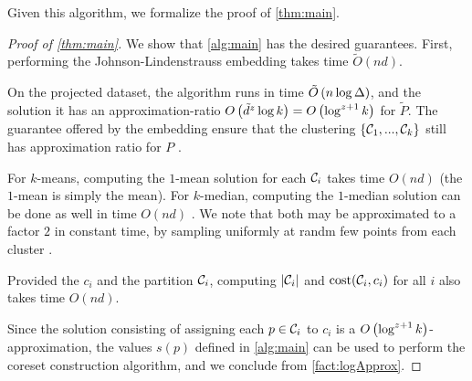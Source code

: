 Given this algorithm, we formalize the proof of \cref{thm:main}.

\begin{proof}[Proof of \cref{thm:main}]
We show that \cref{alg:main} has the desired guarantees.
First, performing the Johnson-Lindenstrauss embedding takes time $\tilde O(nd)$.

On the projected dataset, the algorithm \fkmeans runs in time $\tilde O\left( n \log \Delta\right)$, and the solution it has an approximation-ratio $O\left( \tilde{d}^z \log k\right) = O\left(\log^{z+1} k\right)$ for $\tilde P$. 
The guarantee offered by the embedding ensure that the clustering $\left\{ \mathcal C_1,...,\mathcal C_k\right\}$ still has approximation ratio for $P$ \cite{makarychev2019performance}. 

For $k$-means, computing the $1$-mean solution for each $\mathcal C_i$ takes time $O(nd)$ (the $1$-mean is simply the mean). 
For $k$-median, computing the $1$-median solution can be done as well in time $O(nd)$ \cite{CohenLMPS16}. 
We note that both may be approximated to a factor $2$ in constant time, by sampling uniformly at randm few points from each cluster \cite{neurips21}.

Provided the $c_i$ and the partition $\mathcal C_i$, computing $|\mathcal C_i|$ and $\operatorname{cost}(\mathcal C_i, c_i)$ for all $i$ also takes time $O(nd)$.

Since the solution consisting of assigning each $p \in \mathcal C_i$ to $c_i$ is a $O\left( \log^{z+1} k\right)$-approximation, the values $s(p)$ defined in \cref{alg:main} can be used to perform the coreset construction algorithm, and we conclude from \cref{fact:logApprox}.
\end{proof}

